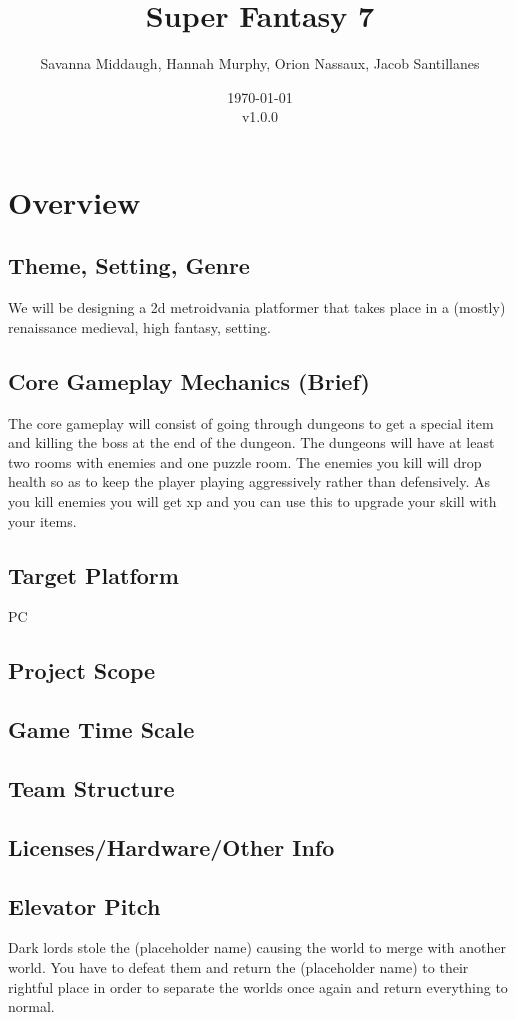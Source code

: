 \documentclass[titlepage]{article}
\title{Super Fantasy 7}
\author{Savanna Middaugh, Hannah Murphy, Orion Nassaux, Jacob Santillanes}
\date{\today\\v1.0.0}
\begin{document}
\maketitle
\section{Overview}
\subsection*{Theme, Setting, Genre}
We will be designing a 2d metroidvania platformer that takes place in a (mostly) renaissance medieval, high fantasy, setting. 
\subsection*{Core Gameplay Mechanics (Brief)}
The core gameplay will consist of going through dungeons to get a special item and killing the boss at the end of the dungeon. The dungeons will have at least two rooms with enemies and one puzzle room. The enemies you kill will drop health so as to keep the player playing aggressively rather than defensively. As you kill enemies you will get xp and you can use this to upgrade your skill with your items. 
\subsection*{Target Platform}
PC
\subsection*{Project Scope}
\subsection*{Game Time Scale}
\subsection*{Team Structure}
\subsection*{Licenses/Hardware/Other Info}
\subsection*{Elevator Pitch}
Dark lords stole the (placeholder name) causing the world to merge with another world. You have to defeat them and return the (placeholder name) to their rightful place in order to separate the worlds once again and return everything to normal. 
\end{document}
